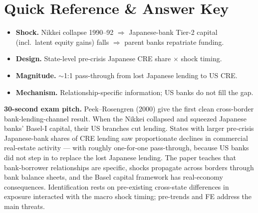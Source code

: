 \documentclass[11pt]{article}
\begin{document}
\section*{Quick Reference \& Answer Key}
\begin{answerbox}
\begin{itemize}
\item \textbf{Shock.} Nikkei collapse 1990--92 $\Rightarrow$ Japanese-bank Tier-2 capital (incl.\ latent equity gains) falls $\Rightarrow$ parent banks repatriate funding.
\item \textbf{Design.} State-level pre-crisis Japanese CRE share $\times$ shock timing.
\item \textbf{Magnitude.} $\sim$1:1 pass-through from lost Japanese lending to US CRE.
\item \textbf{Mechanism.} Relationship-specific information; US banks do not fill the gap.
\end{itemize}
\end{answerbox}

\begin{keybox}
\textbf{30-second exam pitch.} Peek--Rosengren (2000) give the first clean cross-border bank-lending-channel result. When the Nikkei collapsed and squeezed Japanese banks' Basel-I capital, their US branches cut lending. States with larger pre-crisis Japanese-bank shares of CRE lending saw proportionate declines in commercial real-estate activity --- with roughly one-for-one pass-through, because US banks did not step in to replace the lost Japanese lending. The paper teaches that bank-borrower relationships are specific, shocks propagate across borders through bank balance sheets, and the Basel capital framework has real-economy consequences. Identification rests on pre-existing cross-state differences in exposure interacted with the macro shock timing; pre-trends and FE address the main threats.
\end{keybox}
\end{document}
